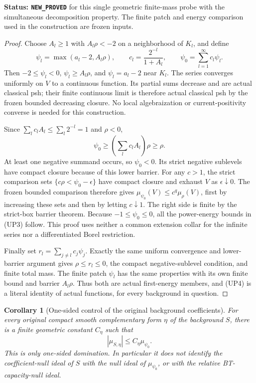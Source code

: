 \documentclass[11pt,a4paper]{article}
\numberwithin{equation}{section}
\newtheorem{corollary}[theorem]{Corollary}
\theoremstyle{definition}
\theoremstyle{remark}
\begin{document}
\noindent\textbf{Status: \texttt{NEW\_PROVED}} for this single
geometric finite-mass probe with the simultaneous decomposition
property.  The finite patch and energy comparison used in the
construction are frozen inputs.

\begin{proof}
Choose $A_l\geq1$ with $A_l\rho<-2$ on a neighborhood of $K_l$,
and define
\[
 \psi_l=\max(a_l-2,A_l\rho),\qquad
 c_l=\frac{2^{-l}}{1+A_l},\qquad
                     \psi_0=\sum_{l=1}^\infty c_l\psi_l.
 \tag{UP5}
\]
Then $-2\leq\psi_l<0$, $\psi_l\geq A_l\rho$, and
$\psi_l=a_l-2$ near $K_l$.  The series converges uniformly on
$V$ to a continuous function.  Its partial sums decrease and
are actual classical psh; their finite continuous limit is
therefore actual classical psh by the frozen bounded decreasing
closure.  No local algebraization or current-positivity converse
is needed for this construction.

Since $\sum_lc_lA_l\leq\sum_l2^{-l}=1$ and $\rho<0$,
\[
           \psi_0\geq\left(\sum_lc_lA_l\right)\rho\geq\rho.
\]
At least one negative summand occurs, so $\psi_0<0$.
Its strict negative sublevels have compact closure because of
this lower barrier.  For any $c>1$, the strict comparison sets
$\{c\rho<\psi_0-\epsilon\}$ have compact closure and exhaust
$V$ as $\epsilon\downarrow0$.  The frozen bounded comparison
therefore gives $\mu_{\psi_0}(V)\leq c^q\mu_\rho(V)$, first
by increasing these sets and then by letting $c\downarrow1$.
The right side is finite by the strict-box barrier theorem.
Because $-1\leq\psi_0\leq0$, all the power-energy bounds in
(UP3) follow.  This proof uses neither a common extension collar
for the infinite series nor a differentiated Borel restriction.

Finally set $r_l=\sum_{j\ne l}c_j\psi_j$.  Exactly the same
uniform convergence and lower-barrier argument gives
$\rho\leq r_l\leq0$, the compact negative-sublevel condition,
and finite total mass.  The finite patch $\psi_l$ has the
same properties with its own finite bound and barrier $A_l\rho$.
Thus both are actual first-energy members, and (UP4) is a literal
identity of actual functions, for every background in question.
\end{proof}

\begin{corollary}[One-sided control of the original background coefficients]
\label{cor:r12-universal-probe-background-control}
For every original compact smooth complementary form $\eta$ of
the background $S$, there is a finite geometric constant $C_\eta$
such that
\[
                         |\mu_{S,\eta}|\leq C_\eta\mu_{\psi_0}.
 \tag{UP6}
\]
This is only one-sided domination.  In particular it does not
identify the coefficient-null ideal of $S$ with the null ideal of
$\mu_{\psi_0}$, or with the relative BT-capacity-null ideal.
\end{corollary}
\end{document}
